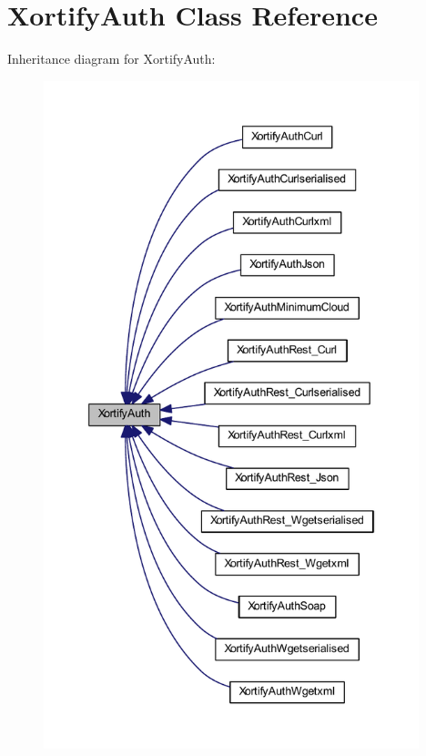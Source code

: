 \hypertarget{class_xortify_auth}{\section{Xortify\-Auth Class Reference}
\label{class_xortify_auth}
}


Inheritance diagram for Xortify\-Auth\-:
\nopagebreak
\begin{figure}[H]
\begin{center}
\leavevmode
\includegraphics[height=550pt]{class_xortify_auth__inherit__graph}
\end{center}
\end{figure}
